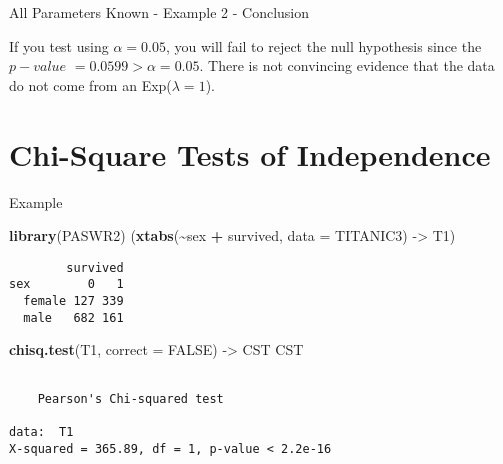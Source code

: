\documentclass[
  ignorenonframetext,
]{beamer}
\newenvironment{Shaded}{\begin{snugshade}}{\end{snugshade}}
\newcommand{\AttributeTok}[1]{\textcolor[rgb]{0.13,0.29,0.53}{#1}}
\newcommand{\ConstantTok}[1]{\textcolor[rgb]{0.56,0.35,0.01}{#1}}
\newcommand{\FunctionTok}[1]{\textcolor[rgb]{0.13,0.29,0.53}{\textbf{#1}}}
\newcommand{\NormalTok}[1]{#1}
\newcommand{\OtherTok}[1]{\textcolor[rgb]{0.56,0.35,0.01}{#1}}
\newcommand{\SpecialCharTok}[1]{\textcolor[rgb]{0.81,0.36,0.00}{\textbf{#1}}}
\begin{document}
\begin{frame}{All Parameters Known - Example 2 - Conclusion}
\protect\hypertarget{all-parameters-known---example-2---conclusion}{}
\begin{tcolorbox}
If you test using $\alpha = 0.05$, you will fail to reject the null hypothesis since the $p-value$ $= 0.0599 > \alpha = 0.05$.  There is not convincing evidence that the data do not come from an Exp($\lambda = 1$).
\end{tcolorbox}
\end{frame}

\hypertarget{chi-square-tests-of-independence}{%
\section{Chi-Square Tests of
Independence}\label{chi-square-tests-of-independence}}

\begin{frame}[fragile]{Example}
\protect\hypertarget{example}{}
\begin{Shaded}
\begin{Highlighting}[]
\FunctionTok{library}\NormalTok{(PASWR2)}
\NormalTok{(}\FunctionTok{xtabs}\NormalTok{(}\SpecialCharTok{\textasciitilde{}}\NormalTok{sex }\SpecialCharTok{+}\NormalTok{ survived, }\AttributeTok{data =}\NormalTok{ TITANIC3) }\OtherTok{{-}\textgreater{}}\NormalTok{ T1)}
\end{Highlighting}
\end{Shaded}

\begin{verbatim}
        survived
sex        0   1
  female 127 339
  male   682 161
\end{verbatim}

\begin{Shaded}
\begin{Highlighting}[]
\FunctionTok{chisq.test}\NormalTok{(T1, }\AttributeTok{correct =} \ConstantTok{FALSE}\NormalTok{) }\OtherTok{{-}\textgreater{}}\NormalTok{ CST}
\NormalTok{CST}
\end{Highlighting}
\end{Shaded}

\begin{verbatim}

    Pearson's Chi-squared test

data:  T1
X-squared = 365.89, df = 1, p-value < 2.2e-16
\end{verbatim}
\end{frame}
\end{document}
